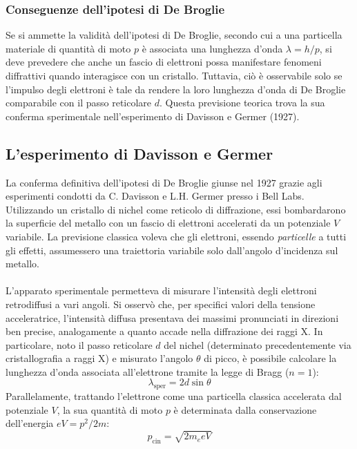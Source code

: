 \documentclass[a4paper,11pt]{report}
\begin{document}
\subsubsection{Conseguenze dell'ipotesi di De Broglie}

Se si ammette la validità dell'ipotesi di De Broglie, secondo cui a una particella materiale di quantità di moto $p$ è associata una lunghezza d'onda $\lambda = h/p$, si deve prevedere che anche un fascio di elettroni possa manifestare fenomeni diffrattivi quando interagisce con un cristallo.
Tuttavia, ciò è osservabile solo se l'impulso degli elettroni è tale da rendere la loro lunghezza d'onda di De Broglie comparabile con il passo reticolare $d$. Questa previsione teorica trova la sua conferma sperimentale nell'esperimento di Davisson e Germer (1927).

\subsection{L'esperimento di Davisson e Germer}
La conferma definitiva dell'ipotesi di De Broglie giunse nel 1927 grazie agli esperimenti condotti da C. Davisson e L.H. Germer presso i Bell Labs. Utilizzando un cristallo di nichel come reticolo di diffrazione, essi bombardarono la superficie del metallo con un fascio di elettroni accelerati da un potenziale $V$ variabile. La previsione classica voleva che gli elettroni, essendo \textit{particelle} a tutti gli effetti, assumessero una traiettoria variabile solo dall'angolo d'incidenza sul metallo. \\
\\
\noindent
L'apparato sperimentale permetteva di misurare l'intensità degli elettroni retrodiffusi a vari angoli. Si osservò che, per specifici valori della tensione acceleratrice, l'intensità diffusa presentava dei massimi pronunciati in direzioni ben precise, analogamente a quanto accade nella diffrazione dei raggi X.
In particolare, noto il passo reticolare $d$ del nichel (determinato precedentemente via cristallografia a raggi X) e misurato l'angolo $\theta$ di picco, è possibile calcolare la lunghezza d'onda associata all'elettrone tramite la legge di Bragg ($n=1$):
\begin{equation}
    \lambda_{\text{sper}} = 2d \sin\theta
\end{equation}
Parallelamente, trattando l'elettrone come una particella classica accelerata dal potenziale $V$, la sua quantità di moto $p$ è determinata dalla conservazione dell'energia $eV = p^2 / 2m$:
\begin{equation}
    p_{\text{cin}} = \sqrt{2m_e eV}
\end{equation}
\end{document}
